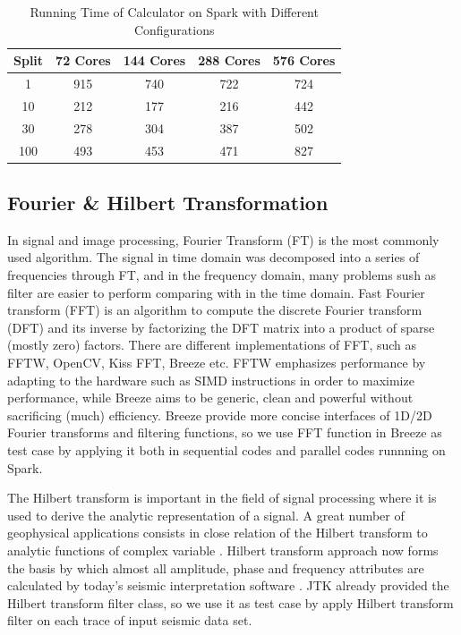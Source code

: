 
\begin{table}[H]
\caption{Running Time of Calculator on Spark with Different Configurations}
\centering
\begin{tabular}{||c| c c c c ||} 
 \hline
 Split & 72 Cores & 144 Cores & 288 Cores & 576 Cores \\ [0.5ex] 
 \hline
 1 & 915 & 740 & 722 & 724 \\ 
 10 & 212 & 177 & 216 & 442 \\
 30 & 278 & 304 & 387 & 502 \\
 100 & 493 & 453 & 471 & 827 \\
 \hline
\end{tabular}
\label{table:CalcSpark}
\end{table}


\subsection{Fourier \& Hilbert Transformation}
In signal and image processing, Fourier Transform (FT) is the most commonly used algorithm. The signal in time domain was decomposed into a series of frequencies  through FT, and in the frequency domain, many problems sush as filter are easier to perform comparing with in the time domain. Fast Fourier transform (FFT) \cite{FFTWiki} is an algorithm to compute the discrete Fourier transform (DFT) and its inverse by factorizing the DFT matrix into a product of sparse (mostly zero) factors. There are different implementations of FFT, such as FFTW, OpenCV, Kiss FFT, Breeze etc. FFTW\cite{FFTW05} emphasizes performance by adapting to the hardware such as SIMD instructions in order to maximize performance, while Breeze aims to be generic, clean and powerful without sacrificing (much) efficiency. Breeze provide more concise interfaces of 1D/2D Fourier transforms and filtering functions, so we use FFT function in Breeze as test case by applying it both in sequential codes and parallel codes runnning on Spark.     

The Hilbert transform \cite{HilbertWiki} is important in the field of signal processing where it is used to derive the analytic representation of a signal. A great number of geophysical applications consists in close relation of the Hilbert transform to analytic functions of complex variable \cite{HilbertGeoApplication}. Hilbert transform approach now forms the basis by which almost all amplitude, phase and frequency attributes are calculated by today’s seismic interpretation software \cite{HilbertSeismic}. JTK already provided the Hilbert transform filter class, so we use it as test case by apply Hilbert transform filter on each trace of input seismic data set.

